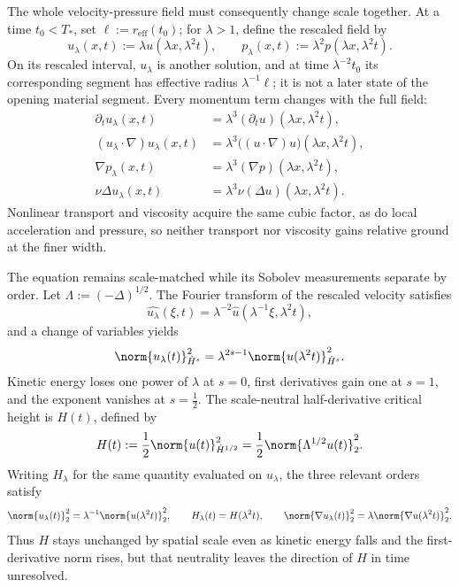 
The whole velocity-pressure field must consequently change scale together. At a time \(t_0<T_*\), set \(\ell:=r_{\mathrm{eff}}(t_0)\); for \(\lambda>1\), define the rescaled field by
\[
  u_\lambda(x,t)
  :=
  \lambda u(\lambda x,\lambda^2t),
  \qquad
  p_\lambda(x,t)
  :=
  \lambda^2p(\lambda x,\lambda^2t).
\]
On its rescaled interval, \(u_\lambda\) is another solution, and at time \(\lambda^{-2}t_0\) its corresponding segment has effective radius \(\lambda^{-1}\ell\); it is not a later state of the opening material segment. Every momentum term changes with the full field:
\[
\begin{aligned}
  \partial_tu_\lambda(x,t)
  &=
  \lambda^3(\partial_tu)(\lambda x,\lambda^2t),
  \\
  (u_\lambda\cdot\nabla)u_\lambda(x,t)
  &=
  \lambda^3\bigl((u\cdot\nabla)u\bigr)(\lambda x,\lambda^2t),
  \\
  \nabla p_\lambda(x,t)
  &=
  \lambda^3(\nabla p)(\lambda x,\lambda^2t),
  \\
  \nu\Delta u_\lambda(x,t)
  &=
  \lambda^3\nu(\Delta u)(\lambda x,\lambda^2t).
\end{aligned}
\]
Nonlinear transport and viscosity acquire the same cubic factor, as do local acceleration and pressure, so neither transport nor viscosity gains relative ground at the finer width.


The equation remains scale-matched while its Sobolev measurements separate by order. Let \(\Lambda:=(-\Delta)^{1/2}\). The Fourier transform of the rescaled velocity satisfies
\[
  \widehat{u_\lambda}(\xi,t)
  =
  \lambda^{-2}\widehat u(\lambda^{-1}\xi,\lambda^2t),
\]
and a change of variables yields
\[
  \norm{u_\lambda(t)}_{\dot H^s}^2
  =
  \lambda^{2s-1}
  \norm{u(\lambda^2t)}_{\dot H^s}^2.
\]
Kinetic energy loses one power of \(\lambda\) at \(s=0\), first derivatives gain one at \(s=1\), and the exponent vanishes at \(s=\tfrac12\). The scale-neutral half-derivative critical height is \(H(t)\), defined by
\[
  H(t)
  :=
  \frac12\norm{u(t)}_{\dot H^{1/2}}^2
  =
  \frac12\norm{\Lambda^{1/2}u(t)}_2^2.
\]
Writing \(H_\lambda\) for the same quantity evaluated on \(u_\lambda\), the three relevant orders satisfy
\[
  \norm{u_\lambda(t)}_2^2
  =
  \lambda^{-1}\norm{u(\lambda^2t)}_2^2,
  \qquad
  H_\lambda(t)=H(\lambda^2t),
  \qquad
  \norm{\nabla u_\lambda(t)}_2^2
  =
  \lambda\norm{\nabla u(\lambda^2t)}_2^2.
\]
Thus \(H\) stays unchanged by spatial scale even as kinetic energy falls and the first-derivative norm rises, but that neutrality leaves the direction of \(H\) in time unresolved.

